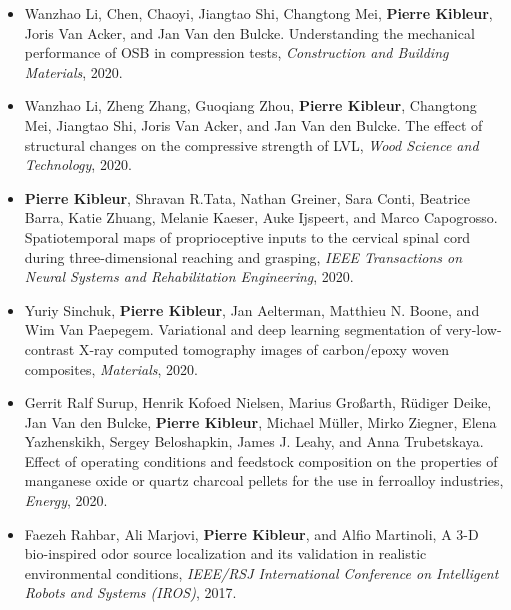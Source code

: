 \documentclass[oneside, english, 10pt, a4paper]{memoir}
\begin{document}
\begin{itemize}
    	\item  {Wanzhao Li, Chen, Chaoyi, Jiangtao Shi, Changtong Mei, \textbf{Pierre Kibleur}, Joris Van Acker, and Jan Van den Bulcke}. {Understanding the mechanical performance of OSB in compression tests}, \emph{Construction and Building Materials}, 2020.
    	
    	\item {Wanzhao Li, Zheng Zhang, Guoqiang Zhou, \textbf{Pierre Kibleur}, Changtong Mei, Jiangtao Shi, Joris Van Acker, and Jan Van den Bulcke}. {The effect of structural changes on the compressive strength of LVL}, \emph{Wood Science and Technology}, 2020.     
    	
    	\item {\textbf{Pierre Kibleur}, Shravan R.Tata, Nathan Greiner, Sara Conti, Beatrice Barra, Katie Zhuang, Melanie Kaeser, Auke Ijspeert, and Marco Capogrosso}. {Spatiotemporal maps of proprioceptive inputs to the cervical spinal cord during three-dimensional reaching and grasping}, \emph{IEEE Transactions on Neural Systems and Rehabilitation Engineering}, 2020.
    	
    	\item {Yuriy Sinchuk, \textbf{Pierre Kibleur}, Jan Aelterman, Matthieu N. Boone, and Wim Van Paepegem}. {Variational and deep learning segmentation of very-low-contrast X-ray computed tomography images of carbon/epoxy woven composites}, \emph{Materials}, 2020.   
    	
    	\item {Gerrit Ralf Surup, Henrik Kofoed Nielsen, Marius Gro{\ss}arth, R{\"{u}}diger Deike, Jan Van den Bulcke, \textbf{Pierre Kibleur}, Michael M{\"{u}}ller, Mirko Ziegner, Elena Yazhenskikh, Sergey Beloshapkin, James J. Leahy, and Anna Trubetskaya}. {Effect of operating conditions and feedstock composition on the properties of manganese oxide or quartz charcoal pellets for the use in ferroalloy industries}, \emph{Energy}, 2020.
    	
    	\item {Faezeh Rahbar, Ali Marjovi, \textbf{Pierre Kibleur}, and Alfio Martinoli, A 3-D bio-inspired odor source localization and its validation in realistic environmental conditions, \emph{IEEE/RSJ International Conference on Intelligent Robots and Systems (IROS)}, 2017.}
    \end{itemize}
       
\end{document}
